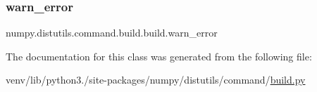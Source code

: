 \mbox{\label{classnumpy_1_1distutils_1_1command_1_1build_1_1build_a196cca2af6de5bd06747e942802749fb}} 
\subsubsection{\texorpdfstring{warn\+\_\+error}{warn\_error}}
{\footnotesize\ttfamily numpy.\+distutils.\+command.\+build.\+build.\+warn\+\_\+error}



The documentation for this class was generated from the following file\+:\begin{DoxyCompactItemize}
\item 
venv/lib/python3./site-\/packages/numpy/distutils/command/\hyperlink{numpy_2distutils_2command_2build_8py}{build.\+py}\end{DoxyCompactItemize}
